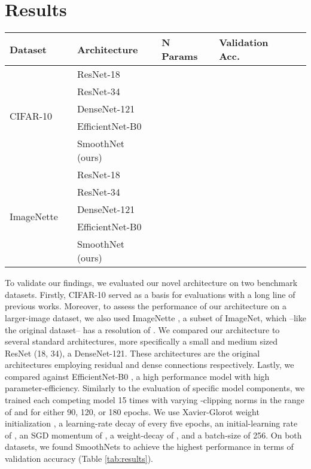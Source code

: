 \documentclass[nohyperref]{article}
\theoremstyle{plain}
\theoremstyle{definition}
\theoremstyle{remark}
\begin{document}
\section{Results} 
\begin{table*}[ht]
    \centering
    \begin{tabular}{@{}llllll@{}}
    \toprule
        Dataset &   & Architecture& N Params& Validation Acc.  \\ \midrule \multirow{5}{*}{CIFAR-10} & \multirow{5}{*}{} & ResNet-18 &  & \\
        && ResNet-34 &  &  \\
&& DenseNet-121 &  & \\
        && EfficientNet-B0 &  & \\
        && SmoothNet (ours) & & \\ \midrule
\multirow{5}{*}{ImageNette} & \multirow{5}{*}{} & ResNet-18 &  & \\
        && ResNet-34 &  & \\
&& DenseNet-121 &  &  \\&& EfficientNet-B0 &  & \\
        && SmoothNet (ours) &   &  \\\bottomrule
    \end{tabular}
    \caption{Benchmarking SmoothNet against standard architectures on CIFAR-10 and ImageNette with Differential Privacy. N Params refers to the number of trainable parameters in the network in Millions. Validation Acc. refers to the corresponding row's best model's accuracy on the validation set.}
    \label{tab:results}
\end{table*}
To validate our findings, we evaluated our novel architecture on two benchmark datasets. Firstly, CIFAR-10 served as a basis for evaluations with a long line of previous works. Moreover, to assess the performance of our architecture on a larger-image dataset, we also used ImageNette \cite{imagenette}, a subset of ImageNet, which --like the original dataset-- has a resolution of . We compared our architecture to several standard architectures, more specifically a small and medium sized ResNet (18, 34), a DenseNet-121. These architectures are the original architectures employing residual and dense connections respectively.  Lastly, we compared against EfficientNet-B0 \cite{tan2019efficientnet}, a high performance model with high parameter-efficiency. Similarly to the evaluation of specific model components, we trained each competing model 15 times with varying -clipping norms in the range of  and for either 90, 120, or 180 epochs. We use Xavier-Glorot weight initialization \cite{Glorot2010UnderstandingTD}, a learning-rate decay of  every five epochs, an initial-learning rate of , an SGD momentum of , a weight-decay of , and a batch-size of 256.
On both datasets, we found SmoothNets to achieve the highest performance in terms of validation accuracy (Table \ref{tab:results}). 
\end{document}
